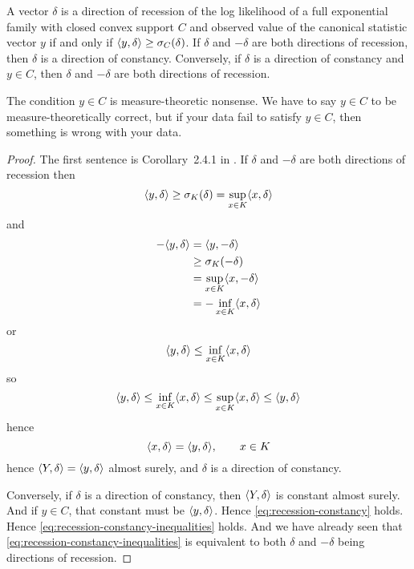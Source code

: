 \begin{theorem} \label{th:recession-constancy}
A vector $\delta$ is a direction of recession of the log likelihood of
a full exponential family
with closed convex support $C$ and observed value of the canonical statistic
vector $y$ if and only if $\langle y, \delta \rangle \ge \sigma_C(\delta)$.
If $\delta$ and $- \delta$ are both directions of recession, then $\delta$
is a direction of constancy.
Conversely, if $\delta$ is a direction of constancy and $y \in C$,
then $\delta$ and $- \delta$ are both directions of recession.
\end{theorem}
The condition $y \in C$ is measure-theoretic nonsense.
We have to say $y \in C$ to be measure-theoretically correct, but
if your data fail to satisfy $y \in C$, then something is wrong with your data.
\begin{proof}
The first sentence is Corollary~{2.4.1} in \citet{geyer-thesis}.
If $\delta$ and $- \delta$ are both directions of recession then
$$
   \langle y, \delta \rangle \ge \sigma_K(\delta) = \sup_{x \in K} \langle x, \delta \rangle
$$
and
\begin{align*}
   - \langle y, \delta \rangle
   & =
   \langle y, - \delta \rangle
   \\
   & \ge
   \sigma_K(- \delta)
   \\
   & =
   \sup_{x \in K} \langle x, - \delta \rangle
   \\
   & =
   - \inf_{x \in K} \langle x, \delta \rangle
\end{align*}
or
$$
   \langle y, \delta \rangle \le \inf_{x \in K} \langle x, \delta \rangle
$$
so
\begin{equation} \label{eq:recession-constancy-inequalities}
   \langle y, \delta \rangle \le \inf_{x \in K} \langle x, \delta \rangle
   \le
   \sup_{x \in K} \langle x, \delta \rangle \le \langle y, \delta \rangle 
\end{equation}
hence
\begin{equation} \label{eq:recession-constancy}
   \langle x, \delta \rangle = \langle y, \delta \rangle, \qquad x \in K
\end{equation}
hence $\langle Y, \delta \rangle = \langle y, \delta \rangle$ almost surely,
and $\delta$ is a direction of constancy.

Conversely, if $\delta$ is a direction of constancy, then $\langle Y, \delta \rangle$
is constant almost surely.  And if $y \in C$, that constant must
be $\langle y, \delta \rangle$.  Hence \eqref{eq:recession-constancy} holds.
Hence \eqref{eq:recession-constancy-inequalities} holds.
And we have already seen that \eqref{eq:recession-constancy-inequalities}
is equivalent to both $\delta$ and $- \delta$ being directions of recession.
\end{proof}

